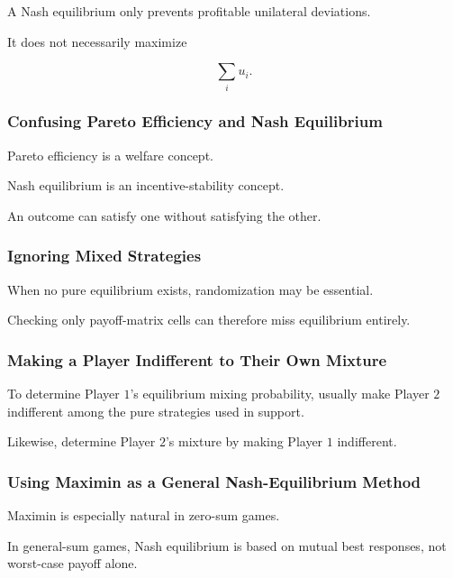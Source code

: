 A Nash equilibrium only prevents profitable unilateral deviations.

It does not necessarily maximize

\[
\sum_i
u_i.
\]

\subsubsection{Confusing Pareto Efficiency and Nash Equilibrium}

Pareto efficiency is a welfare concept.

Nash equilibrium is an incentive-stability concept.

An outcome can satisfy one without satisfying the other.

\subsubsection{Ignoring Mixed Strategies}

When no pure equilibrium exists, randomization may be essential.

Checking only payoff-matrix cells can therefore miss equilibrium entirely.

\subsubsection{Making a Player Indifferent to Their Own Mixture}

To determine Player \(1\)'s equilibrium mixing probability, usually make
Player \(2\) indifferent among the pure strategies used in support.

Likewise, determine Player \(2\)'s mixture by making Player \(1\)
indifferent.

\subsubsection{Using Maximin as a General Nash-Equilibrium Method}

Maximin is especially natural in zero-sum games.

In general-sum games, Nash equilibrium is based on mutual best responses,
not worst-case payoff alone.

